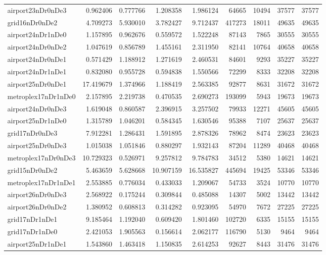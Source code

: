 \begin{longtable}{|l|r|r|r|r|r|r|r|r|}
airport23nDr0nDe3 & 0.962406 & 0.777766 & 1.208358 & 1.986124 & 64665 & 10494 & 37577 & 37577 \\
grid16nDr0nDe2 & 4.709273 & 5.930010 & 3.782427 & 9.712437 & 417273 & 18011 & 49635 & 49635 \\
airport24nDr1nDe0 & 1.157895 & 0.962676 & 0.559572 & 1.522248 & 87143 & 7865 & 30555 & 30555 \\
airport24nDr0nDe2 & 1.047619 & 0.856789 & 1.455161 & 2.311950 & 82141 & 10764 & 40658 & 40658 \\
airport24nDr0nDe1 & 0.571429 & 1.188912 & 1.271619 & 2.460531 & 84601 & 9293 & 35227 & 35227 \\
airport24nDr1nDe1 & 0.832080 & 0.955728 & 0.594838 & 1.550566 & 72299 & 8333 & 32208 & 32208 \\
airport25nDr0nDe1 & 17.419679 & 1.374966 & 1.188419 & 2.563385 & 92877 & 8631 & 31672 & 31672 \\
metroplex17nDr1nDe0 & 2.157895 & 2.219738 & 0.470535 & 2.690273 & 193099 & 5943 & 19673 & 19673 \\
airport24nDr0nDe3 & 1.619048 & 0.860587 & 2.396915 & 3.257502 & 79933 & 12271 & 45605 & 45605 \\
airport25nDr1nDe0 & 1.315789 & 1.046201 & 0.584345 & 1.630546 & 95388 & 7107 & 25637 & 25637 \\
grid17nDr0nDe3 & 7.912281 & 1.286431 & 1.591895 & 2.878326 & 78962 & 8474 & 23623 & 23623 \\
airport25nDr0nDe3 & 1.015038 & 1.051846 & 0.880297 & 1.932143 & 87204 & 11289 & 40468 & 40468 \\
metroplex17nDr0nDe3 & 10.729323 & 0.526971 & 9.257812 & 9.784783 & 34512 & 5380 & 14621 & 14621 \\
grid15nDr0nDe2 & 5.463659 & 5.628668 & 10.907159 & 16.535827 & 445694 & 19425 & 53346 & 53346 \\
metroplex17nDr1nDe1 & 2.553885 & 0.776034 & 0.433033 & 1.209067 & 54733 & 3524 & 10770 & 10770 \\
airport26nDr0nDe3 & 2.568922 & 0.175244 & 0.309844 & 0.485088 & 14307 & 5002 & 13442 & 13442 \\
airport26nDr0nDe2 & 1.380952 & 0.608813 & 0.314282 & 0.923095 & 54970 & 7672 & 27225 & 27225 \\
grid17nDr1nDe1 & 9.185464 & 1.192040 & 0.609420 & 1.801460 & 102720 & 6335 & 15155 & 15155 \\
grid17nDr1nDe0 & 2.421053 & 1.905563 & 0.156614 & 2.062177 & 116790 & 5130 & 9464 & 9464 \\
airport25nDr1nDe1 & 1.543860 & 1.463418 & 1.150835 & 2.614253 & 92627 & 8443 & 31476 & 31476 \\

\end{longtable}
